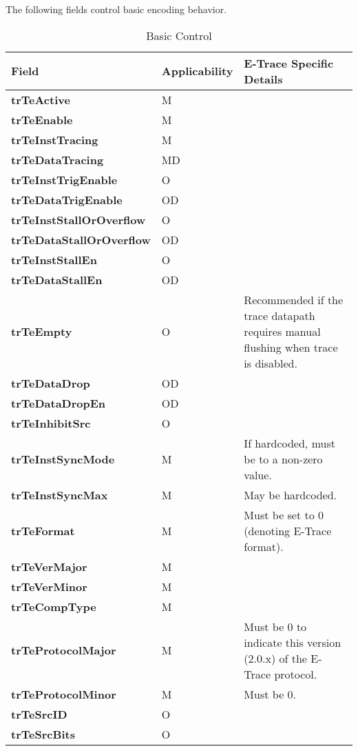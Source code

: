 The following fields control basic encoding behavior.

\begin{table}[htp]
  \centering
  \caption{Basic Control}
  \label{tab:ctl-basic}
  \begin{tabulary}{\textwidth}{|l|l|p{90mm}|}
    \hline
    {\bf Field} & {\bf Applicability} & {\bf E-Trace Specific Details} \\
    \hline
    \textbf{trTeActive} & M & \\
    \hline
    \textbf{trTeEnable} & M & \\
    \hline
    \textbf{trTeInstTracing} & M & \\
    \hline
    \textbf{trTeDataTracing} & MD & \\
    \hline
    \textbf{trTeInstTrigEnable} & O & \\
    \hline
    \textbf{trTeDataTrigEnable} & OD & \\
    \hline
    \textbf{trTeInstStallOrOverflow} & O & \\
    \hline
    \textbf{trTeDataStallOrOverflow} & OD & \\
    \hline
    \textbf{trTeInstStallEn} & O & \\
    \hline
    \textbf{trTeDataStallEn} & OD & \\
    \hline
    \textbf{trTeEmpty} & O & Recommended if the trace datapath requires manual flushing when trace is disabled.\\
    \hline
    \textbf{trTeDataDrop} & OD & \\
    \hline
    \textbf{trTeDataDropEn} & OD & \\
    \hline
    \textbf{trTeInhibitSrc} & O & \\
    \hline
    \textbf{trTeInstSyncMode} & M & If hardcoded, must be to a non-zero value. \\
    \hline
    \textbf{trTeInstSyncMax} & M & May be hardcoded.\\
    \hline
    \textbf{trTeFormat} & M & Must be set to 0 (denoting E-Trace format).\\
    \hline
    \textbf{trTeVerMajor} & M & \\
    \hline
    \textbf{trTeVerMinor} & M & \\
    \hline
    \textbf{trTeCompType} & M & \\
    \hline
    \textbf{trTeProtocolMajor} & M & Must be 0 to indicate this version (2.0.x) of the E-Trace protocol.\\
    \hline
    \textbf{trTeProtocolMinor} & M & Must be 0.\\
    \hline
    \textbf{trTeSrcID} & O & \\
    \hline
    \textbf{trTeSrcBits} & O & \\
    \hline
  \end{tabulary}
\end{table}

